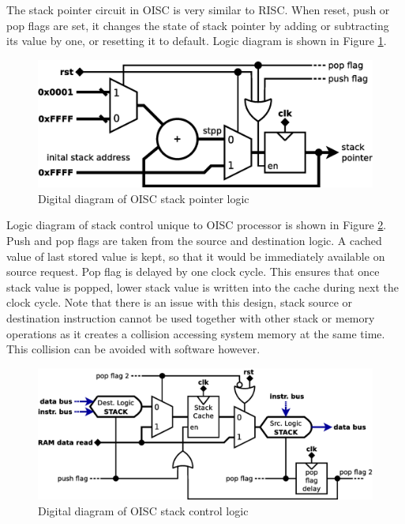 The stack pointer circuit in OISC is very similar to RISC. When reset, push or pop flags are set, it changes the state of stack pointer by adding or subtracting its value by one, or resetting it to default. Logic diagram is shown in Figure \ref{fig:oisc_stack}.
\begin{figure}[b]
	\centering
	\includegraphics[scale=0.4]{../resources/oisc_stack.eps}
	\caption{Digital diagram of OISC stack pointer logic}
	\label{fig:oisc_stack}
\end{figure}

Logic diagram of stack control unique to OISC processor is shown in Figure \ref{fig:oisc_stack_2}. Push and pop flags are taken from the source and destination logic. A cached value of last stored value is kept, so that it would be immediately available on source request. Pop flag is delayed by one clock cycle. This ensures that once stack value is popped, lower stack value is written into the cache during next the clock cycle. Note that there is an issue with this design, stack source or destination instruction cannot be used together with other stack or memory operations as it creates a collision accessing system memory at the same time. This collision can be avoided with software however. 
\begin{figure}
	\centering
	\includegraphics[scale=0.4]{../resources/oisc_stack_2.eps}
	\caption{Digital diagram of OISC stack control logic}
	\label{fig:oisc_stack_2}
\end{figure}

